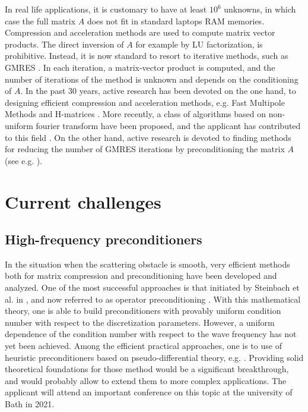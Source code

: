 \documentclass[]{article}
\begin{document}
In real life applications, it is customary to have at least $10^6$ unknowns, in which case the full matrix $A$ does not fit in standard laptops RAM memories. Compression and acceleration methods are used to compute matrix vector products. The direct inversion of $A$ for example by LU factorization, is prohibitive. Instead, it is now standard to resort to iterative methods, such as GMRES \cite{saad1986gmres}. In each iteration, a matrix-vector product is computed, and the number of iterations of the method is unknown and depends on the conditioning of $A$. In the past 30 years, active research has been devoted on the one hand, to designing efficient compression and acceleration methods, e.g. Fast Multipole Methods \cite{greengard1987fast} and H-matrices \cite{hackbusch1999sparse}. More recently, a class of algorithms based on non-uniform fourier transform have been proposed, and the applicant has contributed to this field \cite{averseng2017fast}. On the other hand, active research is devoted to finding methods for reducing the number of GMRES iterations by preconditioning the matrix $A$ (see e.g. \cite{steinbach1998construction}).

\section{Current challenges}


\subsection*{High-frequency preconditioners}

In the situation when the scattering obstacle is smooth, very efficient methods both for matrix compression and preconditioning have been developed and analyzed. One of the most successful approaches is that initiated by Steinbach et al. in \cite{steinbach1998construction}, and now referred to as operator preconditioning \cite{hiptmair2006operator}. With this mathematical theory, one is able to build preconditioners with provably uniform condition number with respect to the discretization parameters. However, a uniform dependence of the condition number with respect to the wave frequency has not yet been achieved. Among the efficient practical approaches, one is to use of heuristic preconditioners based on pseudo-differential theory, e.g. \cite{antoine2007generalized}. Providing solid theoretical foundations for those method would be a significant breakthrough, and would probably allow to extend them to more complex applications. The applicant will attend an important conference on this topic at the university of Bath in 2021. 
\end{document}
